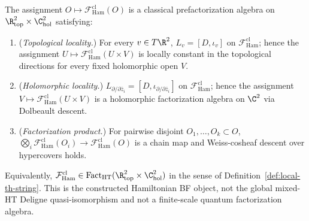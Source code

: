 \documentclass[11pt]{memoir}
\begin{document}
\begin{thm}\label{thm:mixed-HT-factorization-theorem}
  The assignment \(O\mapsto \mathcal F^{\mathrm{cl}}_{\mathrm{Ham}}(O)\)
  is a classical prefactorization algebra on
  \(\R^2_{\mathrm{top}}\times\C^2_{\mathrm{hol}}\) satisfying:
  \begin{enumerate}
    \item (\emph{Topological locality.}) For every \(v\in T\R^2\),
      \(L_v=[D,\iota_v]\) on \(\mathcal F^{\mathrm{cl}}_{\mathrm{Ham}}\);
      hence the assignment \(U\mapsto\mathcal F^{\mathrm{cl}}_{\mathrm{Ham}}(U\times V)\)
      is locally constant in the topological directions for every
      fixed holomorphic open \(V\).
    \item (\emph{Holomorphic locality.})
      \(L_{\partial/\partial\bar z_i}=[D,\iota_{\partial/\partial\bar z_i}]\)
      on \(\mathcal F^{\mathrm{cl}}_{\mathrm{Ham}}\); hence the assignment
      \(V\mapsto\mathcal F^{\mathrm{cl}}_{\mathrm{Ham}}(U\times V)\) is a
      holomorphic factorization algebra on \(\C^2\) via Dolbeault
      descent.
    \item (\emph{Factorization product.}) For pairwise disjoint
      \(O_1,\ldots,O_k\subset O\),
      \(\bigotimes_i\mathcal F^{\mathrm{cl}}_{\mathrm{Ham}}(O_i)
      \to\mathcal F^{\mathrm{cl}}_{\mathrm{Ham}}(O)\) is a chain map and
      Weiss-cosheaf descent over hypercovers holds.
  \end{enumerate}
  Equivalently,
  \(\mathcal F^{\mathrm{cl}}_{\mathrm{Ham}}\in
  \mathrm{Fact}_{\mathrm{HT}}(\R^2_{\mathrm{top}}\times\C^2_{\mathrm{hol}})\)
  in the sense of
  Definition~\ref{def:local-th-string}.  This is the constructed
  Hamiltonian BF object, not the global mixed-HT Deligne
  quasi-isomorphism and not a finite-scale quantum factorization
  algebra.
\end{thm}
\end{document}
